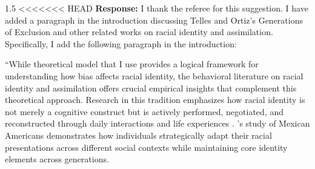 \documentclass[12pt,english]{article}
\newcommand{\rrxspc}{1.5}
\begin{document}
\begin{refsection}
    \begin{spacing}{\rrxspc}
<<<<<<< HEAD
        \textbf{Response:} I thank the referee for this suggestion. I have added a paragraph in the introduction discussing Telles and Ortiz's Generations of Exclusion and other related works on racial identity and assimilation. Specifically, I add the following paragraph in the introduction: 

        ``While \textcite{akerlofEconomicsIdentity2000} theoretical model that I use provides a logical framework for understanding how bias affects racial identity, the behavioral literature on racial identity and assimilation offers crucial empirical insights that complement this theoretical approach. Research in this tradition emphasizes how racial identity is not merely a cognitive construct but is actively performed, negotiated, and reconstructed through daily interactions and life experiences \autocite{waters1990ethnic}. \textcite{telles2008generations}'s study of Mexican Americans demonstrates how individuals strategically adapt their racial presentations across different social contexts while maintaining core identity elements across generations. 


\end{spacing}
\end{refsection}
\end{document}

